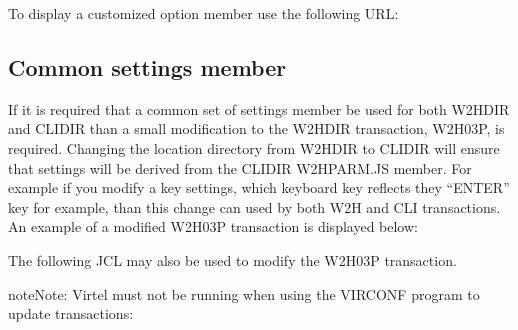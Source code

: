 \documentclass[letterpaper,10pt,english]{sphinxmanual}
\begin{document}
\sphinxAtStartPar
To display a customized option member use the following URL:

\begin{sphinxVerbatim}[commandchars=\\\{\}]
\end{sphinxVerbatim}

\sphinxAtStartPar
{}

\ignorespaces 

\subsection{Common settings member}
\label{\detokenize{Customization:common-settings-member}}\label{\detokenize{Customization:index-3}}
\sphinxAtStartPar
If it is required that a common set of settings member be used for both W2H\sphinxhyphen{}DIR and CLI\sphinxhyphen{}DIR than a small modification to the W2H\sphinxhyphen{}DIR transaction, W2H\sphinxhyphen{}03P, is required. Changing the location directory from W2H\sphinxhyphen{}DIR to CLI\sphinxhyphen{}DIR will ensure that settings will be derived from the CLI\sphinxhyphen{}DIR W2HPARM.JS member. For example if you modify a key settings, which keyboard key reflects they “ENTER” key for example, than this change can used by both W2H and CLI transactions. An example of a modified W2H\sphinxhyphen{}03P transaction is displayed below:

\sphinxAtStartPar
{}

\sphinxAtStartPar
{}

\sphinxAtStartPar
The following JCL may also be used to modify the W2H\sphinxhyphen{}03P transaction.

\begin{sphinxadmonition}{note}{Note:}
\sphinxAtStartPar
Virtel must not be running when using the VIRCONF program to update transactions:
\end{sphinxadmonition}
\end{document}
